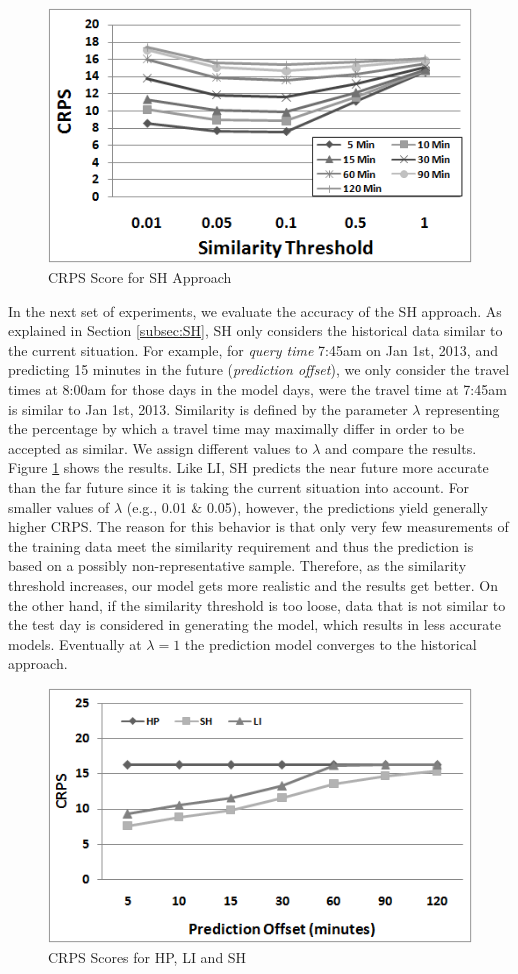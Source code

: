 \begin{figure}[h]
	\centering
	\includegraphics[width = 0.7\columnwidth]{figures/SH_results.png}
	\caption{CRPS Score for SH Approach}\label{fig:SH_results}
\end{figure}

In the next set of experiments, we evaluate the accuracy of the SH approach. As
explained in Section \ref{subsec:SH}, SH only considers the historical data
similar to the current situation. For example, for \textit{query time} 7:45am on
Jan 1st, 2013, and predicting 15 minutes in the future (\textit{prediction
offset}), we only consider the travel times at 8:00am for those days in the model
days, were the travel time  at 7:45am is similar to Jan 1st, 2013.
Similarity is defined by the parameter $\lambda$ representing the percentage
by which a travel time may maximally differ in order to be accepted as similar. 
We assign different values to $\lambda$ and compare the results. Figure
\ref{fig:SH_results} shows the results. Like LI, SH predicts the near future
more accurate than the far future since it is taking the current situation into
account. For smaller values of $\lambda$ (e.g., 0.01 \& 0.05), however, the
predictions yield generally higher CRPS. The reason for this behavior is
that only very few measurements of the training data meet the similarity
requirement and thus the prediction is based on a possibly non-representative
sample. Therefore, as the similarity threshold increases, our model gets more
realistic and the results get better. On the other hand, if the similarity
threshold is too loose, data that is not similar to the test day is
considered in generating the model, which results in less accurate models.
Eventually at $\lambda = 1$ the prediction model converges to the historical
approach.

\begin{figure}[h]
	\centering
	\includegraphics[width = 0.7\columnwidth]{figures/link_results.png}
	\caption{CRPS Scores for HP, LI and SH}\label{fig:all_results}
\end{figure}

